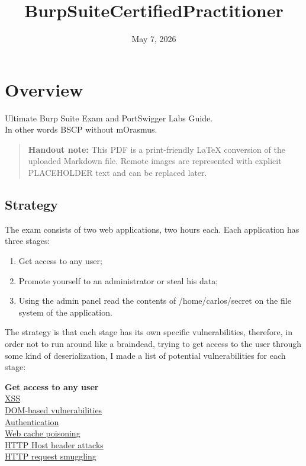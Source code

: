 \documentclass[
  letterpaper,
]{article}
\title{BurpSuiteCertifiedPractitioner}
\author{}
\date{May 7, 2026}
\providecommand{\tightlist}{%
  \setlength{\itemsep}{0pt}\setlength{\parskip}{0pt}}
\begin{document}
\maketitle

{
\hypersetup{linkcolor=}
\setcounter{tocdepth}{3}
\tableofcontents
}
\section{Overview}\label{overview}

Ultimate Burp Suite Exam and PortSwigger Labs Guide.\\
In other words BSCP without mOrasmus.

\begin{quote}
\textbf{Handout note:} This PDF is a print-friendly LaTeX conversion of
the uploaded Markdown file. Remote images are represented with explicit PLACEHOLDER text and can be replaced later.
\end{quote}

\subsection{Strategy}\label{strategy}

The exam consists of two web applications, two hours each. Each
application has three stages:

\begin{enumerate}
\def\labelenumi{\arabic{enumi}.}
\tightlist
\item
  Get access to any user;
\item
  Promote yourself to an administrator or steal his data;
\item
  Using the admin panel read the contents of /home/carlos/secret on the
  file system of the application.
\end{enumerate}

The strategy is that each stage has its own specific vulnerabilities,
therefore, in order not to run around like a braindead, trying to get
access to the user through some kind of deserialization, I made a list
of potential vulnerabilities for each stage:

\textbf{Get access to any user}\\
\href{https://github.com/DingyShark/BurpSuiteCertifiedPractitioner\#xss}{XSS}\\
\href{https://github.com/DingyShark/BurpSuiteCertifiedPractitioner\#dom-based-vulnerabilities}{DOM-based
vulnerabilities}\\
\href{https://github.com/DingyShark/BurpSuiteCertifiedPractitioner\#authentication}{Authentication}\\
\href{https://github.com/DingyShark/BurpSuiteCertifiedPractitioner\#web-cache-poisoning}{Web
cache poisoning}\\
\href{https://github.com/DingyShark/BurpSuiteCertifiedPractitioner\#http-host-header-attacks}{HTTP
Host header attacks}\\
\href{https://github.com/DingyShark/BurpSuiteCertifiedPractitioner\#http-request-smuggling}{HTTP
request smuggling}
\end{document}
